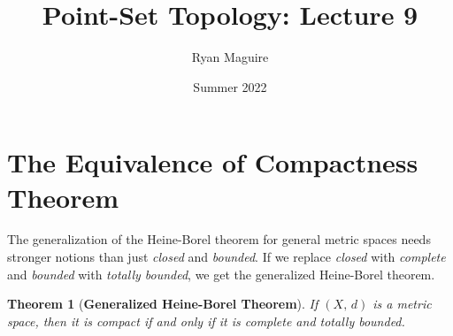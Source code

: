 \documentclass{article}
\title{Point-Set Topology: Lecture 9}
\author{Ryan Maguire}
\date{Summer 2022}
\theoremstyle{plain}
\newtheorem{theorem}{Theorem}[section]
\theoremstyle{normal}
\begin{document}
    \maketitle
    \section{The Equivalence of Compactness Theorem}
        The generalization of the Heine-Borel theorem for general metric spaces
        needs stronger notions than just \textit{closed} and \textit{bounded}.
        If we replace \textit{closed} with \textit{complete} and
        \textit{bounded} with \textit{totally bounded}, we get the
        generalized Heine-Borel theorem.
        \begin{theorem}[\textbf{Generalized Heine-Borel Theorem}]
            If $(X,\,d)$ is a metric space, then it is compact if and only
            if it is complete and totally bounded.
        \end{theorem}
\end{document}
